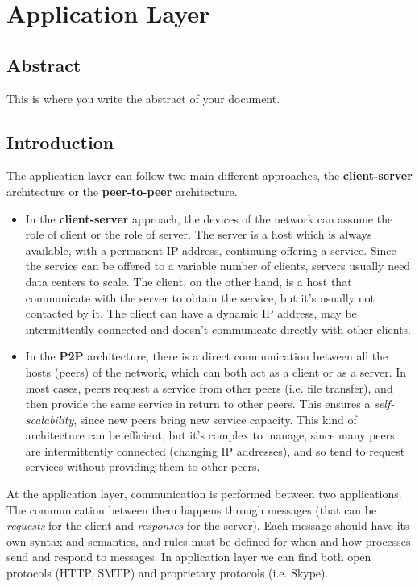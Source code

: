 \chapter[Application Layer]{Application Layer}

\section*{Abstract}         %
This is where you write the abstract of your document.

\section{Introduction}
\label{chap4_sec1}
The application layer can follow two main different approaches, the \textbf{client-server} architecture or the \textbf{peer-to-peer} architecture.
\begin{itemize}
    \item In the \textbf{client-server} approach, the devices of the network can assume the role of client or the role of server. The server is a host which is always available, with a permanent IP address, continuing offering a service. Since the service can be offered to a variable number of clients, servers usually need data centers to scale. The client, on the other hand, is a host that communicate with the server to obtain the service, but it's usually not contacted by it. The client can have a dynamic IP address, may be intermittently connected and doesn't communicate directly with other clients.
    \item In the \textbf{P2P} architecture, there is a direct communication between all the hosts (peers) of the network, which can both act as a client or as a server. In most cases, peers request a service from other peers (i.e. file transfer), and then provide the same service in return to other peers. This ensures a \textit{self-scalability}, since new peers bring new service capacity. This kind of architecture can be efficient, but it's complex to manage, since many peers are intermittently connected (changing IP addresses), and so tend to request services without providing them to other peers.
\end{itemize}

\noindent At the application layer, communication is performed between two applications. The communication between them happens through messages (that can be \textit{requests} for the client and \textit{responses} for the server). Each message should have its own syntax and semantics, and rules must be defined for when and how processes send and respond to messages. In application layer we can find both open protocols (HTTP, SMTP) and proprietary protocols (i.e. Skype).

